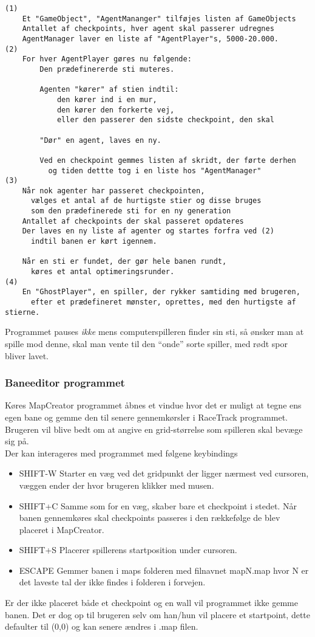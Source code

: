 \begin{lstlisting}
(1)
	Et "GameObject", "AgentMananger" tilføjes listen af GameObjects
	Antallet af checkpoints, hver agent skal passerer udregnes
	AgentManager laver en liste af "AgentPlayer"s, 5000-20.000.
(2)
	For hver AgentPlayer gøres nu følgende:
		Den prædefinererde sti muteres.
		
		Agenten "kører" af stien indtil:
			den kører ind i en mur,
			den kører den forkerte vej,
			eller den passerer den sidste checkpoint, den skal
		
		"Dør" en agent, laves en ny.
		
		Ved en checkpoint gemmes listen af skridt, der førte derhen
		  og tiden dettte tog i en liste hos "AgentManager"
(3)
	Når nok agenter har passeret checkpointen,
	  vælges et antal af de hurtigste stier og disse bruges
	  som den prædefinerede sti for en ny generation
	Antallet af checkpoints der skal passeret opdateres
	Der laves en ny liste af agenter og startes forfra ved (2)
	  indtil banen er kørt igennem.

	Når en sti er fundet, der gør hele banen rundt,
	  køres et antal optimeringsrunder.
(4)
	En "GhostPlayer", en spiller, der rykker samtiding med brugeren,
	  efter et prædefineret mønster, oprettes, med den hurtigste af stierne.
\end{lstlisting}

Programmet pauses \emph{ikke} mens computerspilleren finder sin sti, så ønsker man at spille mod denne,
skal man vente til den ``onde'' sorte spiller, med rødt spor bliver lavet. 


\subsubsection{Baneeditor programmet}
Køres MapCreator programmet åbnes et vindue hvor det er muligt at tegne ens egen bane og gemme den til senere gennemkørsler i RaceTrack programmet. Brugeren vil blive bedt om at angive en grid-størrelse som spilleren skal bevæge sig på. \\
Der kan interageres med programmet med følgene keybindings
\begin{itemize}
  \item SHIFT-W Starter en væg ved det gridpunkt der ligger nærmest ved cursoren, væggen ender der hvor brugeren klikker med musen.
  \item SHIFT+C Samme som for en væg, skaber bare et checkpoint i stedet. Når banen gennemkøres skal checkpoints passeres i den rækkefølge de blev placeret i MapCreator.
  \item SHIFT+S Placerer spillerens startposition under cursoren.
  \item ESCAPE Gemmer banen i maps folderen med filnavnet mapN.map hvor N er det laveste tal der ikke findes i folderen i forvejen.
\end{itemize}
Er der ikke placeret både et checkpoint og en wall vil programmet ikke gemme banen. Det er dog op til brugeren selv om han/hun vil placere et startpoint, dette defaulter til (0,0) og kan senere ændres i .map filen.

